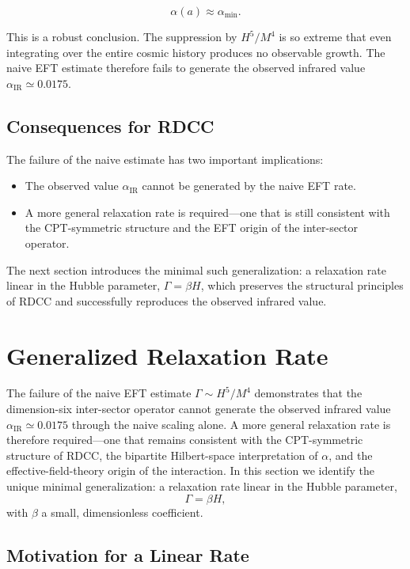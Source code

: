 \documentclass[11pt,a4paper]{article}
\begin{document}
\[
    \alpha(a) \approx \alpha_{\min}.
\]


This is a robust conclusion. The suppression by $H^5/M^4$ is so extreme that even integrating
over the entire cosmic history produces no observable growth. The naive EFT estimate therefore
fails to generate the observed infrared value $\alpha_{\mathrm{IR}} \simeq 0.0175$.

\subsection{Consequences for RDCC}

The failure of the naive estimate has two important implications:

\begin{itemize}
    \item The observed value $\alpha_{\mathrm{IR}}$ cannot be generated by the naive EFT rate.
    \item A more general relaxation rate is required—one that is still consistent with the
    CPT-symmetric structure and the EFT origin of the inter-sector operator.
\end{itemize}

The next section introduces the minimal such generalization: a relaxation rate linear in the
Hubble parameter, $\Gamma = \beta H$, which preserves the structural principles of RDCC and
successfully reproduces the observed infrared value.

\section{Generalized Relaxation Rate}

The failure of the naive EFT estimate $\Gamma \sim H^5/M^4$ demonstrates that the
dimension-six inter-sector operator cannot generate the observed infrared value
$\alpha_{\mathrm{IR}} \simeq 0.0175$ through the naive scaling alone. A more general relaxation rate is
therefore required—one that remains consistent with the CPT-symmetric structure of RDCC,
the bipartite Hilbert-space interpretation of $\alpha$, and the effective-field-theory origin of the
interaction. In this section we identify the unique minimal generalization: a relaxation rate
linear in the Hubble parameter,
\begin{equation}
    \Gamma = \beta H,
\end{equation}
with $\beta$ a small, dimensionless coefficient.

\subsection{Motivation for a Linear Rate}
\end{document}
